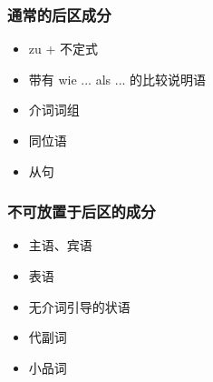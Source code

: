 \subsubsection{通常的后区成分}
\begin{itemize}
    \item zu + 不定式
    \item 带有 wie ... als ... 的比较说明语
    \item 介词词组
    \item 同位语
    \item 从句
\end{itemize}

\subsubsection{不可放置于后区的成分}

\begin{itemize}
    \item 主语、宾语
    \item 表语
    \item 无介词引导的状语
    \item 代副词
    \item 小品词
\end{itemize}

